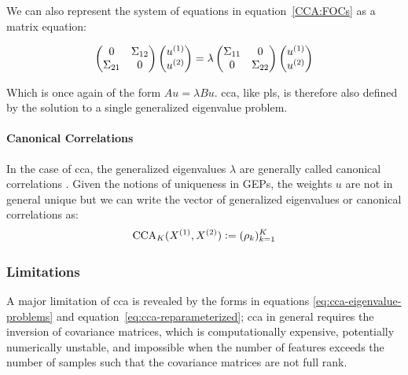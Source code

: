 We can also represent the system of equations in equation~\ref{CCA:FOCs} as a matrix equation:

\begin{align}
    \begin{pmatrix}
        0           & \Sigma_{12} \\
        \Sigma_{21} & 0
    \end{pmatrix}
    \begin{pmatrix}
        u^{(1)} \\
        u^{(2)}
    \end{pmatrix}
    =
    \lambda
    \begin{pmatrix}
        \Sigma_{11} & 0           \\
        0           & \Sigma_{22}
    \end{pmatrix}
    \begin{pmatrix}
        u^{(1)} \\
        u^{(2)}
    \end{pmatrix}
\end{align}

Which is once again of the form $A u = \lambda B u$. \acrshort{cca}, like \acrshort{pls}, is therefore also defined by the solution to a single generalized eigenvalue problem.

\paragraph{Canonical Correlations}
In the case of \acrshort{cca}, the generalized eigenvalues $\lambda$ are generally called canonical correlations \citep{hotelling1935canonical, hotelling1992relations}.
Given the notions of uniqueness in GEPs, the weights $u$ are not in general unique but we can write the vector of generalized eigenvalues or canonical correlations as:
\begin{align}
    \label{eq:cca-vector-of-correlations-def}\small
    \operatorname{CCA}_K(X^{(1)},X^{(2)}) \vcentcolon= (\rho_k)_{k=1}^K
\end{align}

\subsubsection{Limitations}

A major limitation of \acrshort{cca} is revealed by the forms in equations \ref{eq:cca-eigenvalue-problems} and equation~\ref{eq:cca-reparameterized}; \acrshort{cca} in general requires the inversion of covariance matrices, which is computationally expensive, potentially numerically unstable, and impossible when the number of features exceeds the number of samples such that the covariance matrices are not full rank.

